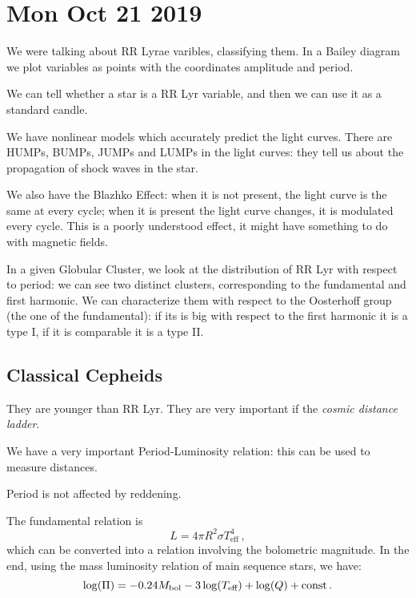 \documentclass[main.tex]{subfiles}
\begin{document}
\section*{Mon Oct 21 2019}

We were talking about RR Lyrae varibles, classifying them.
In a Bailey diagram we plot variables as points with the coordinates amplitude and period.

We can tell whether a star is a RR Lyr variable, and then we can use it as a standard candle.

We have nonlinear models which accurately predict the light curves.
There are HUMPs, BUMPs, JUMPs and LUMPs in the light curves:
they tell us about the propagation of shock waves in the star.

We also have the Blazhko Effect: when it is not present, the light curve is the same at every cycle; when it is present the light curve changes, it is modulated every cycle.
This is a poorly understood effect, it might have something to do with magnetic fields.

In a given Globular Cluster, we look at the distribution of RR Lyr with respect to period: we can see two distinct clusters, corresponding to the fundamental and first harmonic.
We can characterize them with respect to the Oosterhoff group (the one of the fundamental): if its is big with respect to the first harmonic it is a type I, if it is comparable it is a type II.

\subsection{Classical Cepheids}

They are younger than RR Lyr.
They are very important if the \emph{cosmic distance ladder}.

We have a very important Period-Luminosity relation: this can be used to measure distances.

Period is not affected by reddening.

The fundamental relation is 
%
\begin{equation}
  L = 4 \pi R^2 \sigma T^4 _{\text{eff}}
\,,
\end{equation}
%
which can be converted into a relation involving the bolometric magnitude.
In the end,  using the mass luminosity relation of main sequence stars, we have: 
%
\begin{equation}
  \log(\Pi ) = \num{-0.24}M _{\text{bol}} - 3 \log(T _{\text{eff}}) + \log(Q) + \text{const}
\,.
\end{equation}
%
\end{document}
